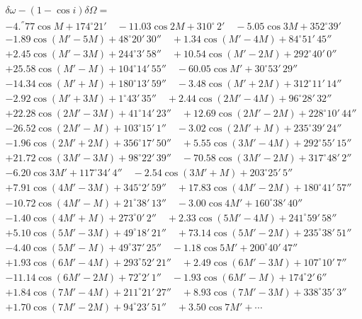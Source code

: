 \documentclass[12pt,a4paper]{article}
\begin{document}
\begin{multline*}
\delta\omega - (1 - \cos i)\delta\Omega =\\
-4.^{''}77 \cos M + 174^{\circ} 21' \quad
-11.03 \cos 2M + 310^{\circ} \, 2' \quad
-5.05 \cos 3M + 352^{\circ} 39'\\
-1.89 \cos(M' - 5M) + 48^{\circ} 20'\, 30'' \quad
+1.34 \cos(M' - 4M) + 84^{\circ} 51'\, 45''\\
+2.45 \cos(M' - 3M) + 244^{\circ} 3'\, 58'' \quad
+10.54 \cos(M' - 2M) + 292^{\circ} 40'\, 0''\\
+25.58 \cos(M' - M) + 104^{\circ} 14'\, 55'' \quad
-60.05 \cos M' + 30^{\circ} 53'\, 29''\\
-14.34 \cos(M' + M) + 180^{\circ} 13'\, 59'' \quad
-3.48 \cos(M' + 2M) + 312^{\circ} 11'\, 14''\\
-2.92 \cos(M' + 3M) + 1^{\circ} 43'\, 35'' \quad
+2.44 \cos(2M' - 4M) + 96^{\circ} 28'\, 32''\\
+22.28 \cos(2M' - 3M) + 41^{\circ} 14'\, 23'' \quad
+12.69 \cos(2M' - 2M) + 228^{\circ} 10'\, 44''\\
-26.52 \cos(2M' - M) + 103^{\circ} 15'\, 1'' \quad
-3.02 \cos(2M' + M) + 235^{\circ} 39'\, 24''\\
-1.96 \cos(2M' + 2M) + 356^{\circ} 17'\, 50'' \quad
+5.55 \cos(3M' - 4M) + 292^{\circ} 55'\, 15''\\
+21.72 \cos(3M' - 3M) + 98^{\circ} 22'\, 39'' \quad
-70.58 \cos(3M' - 2M) + 317^{\circ} 48'\, 2''\\
-6.20 \cos 3M' + 117^{\circ} 34'\, 4'' \quad
-2.54 \cos(3M' + M) + 203^{\circ} 25'\, 5''\\
+7.91 \cos(4M' - 3M) + 345^{\circ} 2'\, 59'' \quad
+17.83 \cos(4M' - 2M) + 180^{\circ} 41'\, 57''\\
-10.72 \cos(4M' - M) + 21^{\circ} 38'\, 13'' \quad
-3.00 \cos 4M' + 160^{\circ} 38'\, 40''\\
-1.40 \cos(4M' + M) + 273^{\circ} 0'\, 2'' \quad
+2.33 \cos(5M' - 4M) + 241^{\circ} 59'\, 58''\\
+5.10 \cos(5M' - 3M) + 49^{\circ} 18'\, 21'' \quad
+73.14 \cos(5M' - 2M) + 235^{\circ} 38'\, 51''\\
-4.40 \cos(5M' - M) + 49^{\circ} 37'\, 25'' \quad
-1.18 \cos 5M' + 200^{\circ} 40'\, 47''\\
+1.93 \cos(6M' - 4M) + 293^{\circ} 52'\, 21'' \quad
+2.49 \cos(6M' - 3M) + 107^{\circ} 10'\, 7''\\
-11.14 \cos(6M' - 2M) + 72^{\circ} 2'\, 1'' \quad
-1.93 \cos(6M' - M) + 174^{\circ} 2'\, 6''\\
+1.84 \cos(7M' - 4M) + 211^{\circ} 21'\, 27'' \quad
+8.93 \cos(7M' - 3M) + 338^{\circ} 35'\, 3''\\
+1.70 \cos(7M' - 2M) + 94^{\circ} 23'\, 51'' \quad
+3.50 \cos 7M' + \cdots
\end{multline*}
\end{document}
